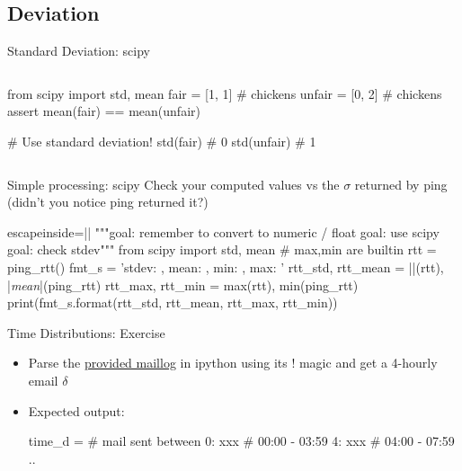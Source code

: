 \subsection{Deviation}
\begin{pyframe}{Standard Deviation: scipy}
\begin{columns}


\begin{pycode}
from scipy import std, mean
fair = [1, 1] # chickens
unfair = [0, 2] # chickens
assert mean(fair) == mean(unfair)

# Use standard deviation!
std(fair) # 0
std(unfair) # 1

\end{pycode}
\end{columns}
\end{pyframe}


\begin{pyframe}{Simple processing: scipy}
Check your computed values vs the $\sigma$ returned by ping 
(didn't you notice ping returned it?) 
\begin{pycode*}{escapeinside=||}
"""goal: remember to convert to numeric / float
   goal: use scipy
   goal: check stdev"""
from scipy import std, mean # max,min are builtin
rtt = ping_rtt()
fmt_s = 'stdev: {}, mean: {}, min: {}, max: {}'
rtt_std, rtt_mean = ||(rtt), |\emph{mean}|(ping_rtt)
rtt_max, rtt_min = max(rtt), min(ping_rtt)
print(fmt_s.format(rtt_std, rtt_mean, rtt_max, rtt_min))
\end{pycode*}
\end{pyframe}

\begin{pyframe}{Time Distributions: Exercise}
\begin{itemize}
\item Parse the \href{https://github.com/ioggstream/python-course/blob/master/python-for-sysadmin/data/maillog}{provided maillog} in ipython using its ! magic and get a 4-hourly email $\delta$
\item Expected output: 
\begin{pycode}
time_d = {  # mail sent between
    0: xxx  #  00:00 - 03:59
    4: xxx  #  04:00 - 07:59
    ..
    }
\end{pycode}
\end{itemize}
\end{pyframe}
 
